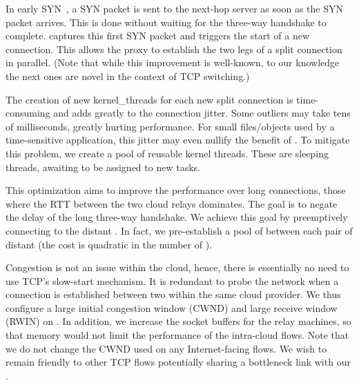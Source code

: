  In early SYN~\cite{ladiwala,siracusano2016miniproxy}, a SYN packet is sent to the next-hop server as soon as the SYN packet arrives. This is done without waiting for the three-way handshake to complete. \oursys captures this first SYN packet and triggers the start of a new connection. This allows the proxy to establish the two legs of a split connection in parallel. (Note that while this improvement is well-known, to our knowledge the next ones are novel in the context of TCP switching.)

The creation of new kernel\_threads for each new split connection is time-consuming and adds greatly to the connection jitter. Some outliers may take tens of milliseconds, greatly hurting performance. For small files/objects used by a time-sensitive application, this jitter may even nullify the benefit of \oursys. To mitigate this problem, we create a pool of reusable kernel threads. These are sleeping threads, awaiting to be assigned to new tasks.

  This optimization aims to improve the performance over long connections, \ie those where the RTT between the two cloud relays dominates. The goal is to negate the delay of the long three-way handshake. We achieve this goal by preemptively connecting to the distant \proxies. In fact, we pre-establish a pool of \reconn between each pair of distant \proxies (the cost is quadratic in the number of \proxies).

Congestion is not an issue within the cloud, hence, there is essentially no need to use TCP's slow-start mechanism. It is redundant to probe the network when a connection is established between two \proxies within the same cloud provider. We thus configure a large initial congestion window (CWND) and large receive window (RWIN) on \oursys \proxies. In addition, we increase the socket buffers for the relay machines, so that memory would not limit the performance of the intra-cloud flows.
Note that we do not change the CWND used on any Internet-facing flows. We wish to remain friendly to other TCP flows potentially sharing a bottleneck link with our \proxies. %







